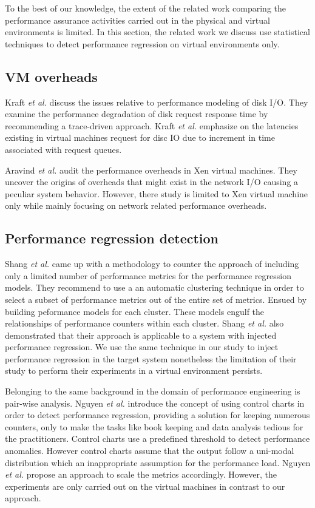 To the best of our knowledge, the extent of the related work comparing the performance assurance activities carried out in the physical and virtual environments is limited. In this section, the related work we discuss use statistical techniques to detect performance regression on virtual environments only. 

\subsection{VM overheads}

Kraft \textit{et al.} \cite{kraft2011io} discuss the issues relative to performance modeling of disk I/O. They examine the performance degradation of disk request response time by recommending a trace-driven approach. Kraft \textit{et al.} \cite{kraft2011io} emphasize on the latencies existing in virtual machines request for disc IO due to increment in time associated with request queues. 

Aravind \textit{et al.} \cite{menon2005diagnosing} audit the performance overheads in Xen virtual machines. They uncover the origins of overheads that might exist in the network I/O causing a peculiar system behavior. However, there study is limited to Xen virtual machine only while mainly focusing on network related performance overheads.

\subsection{Performance regression detection} 

Shang\textit{ et al.} \cite{Shang:2015:ADP:2668930.2688052} came up with a methodology to counter the approach of including only a limited number of performance metrics for the performance regression models. They recommend to use a an automatic clustering technique in order to select a subset of performance metrics out of the entire set of metrics. Ensued by building peformance models for each cluster. These models engulf the relationships of performance counters within each cluster. Shang\textit{ et al.} \cite{Shang:2015:ADP:2668930.2688052} also demonstrated that their approach is applicable to a system with injected performance regression. We use the same technique in our study to inject performance regression in the target system nonetheless the limitation of their study to perform their experiments in a virtual environment persists.

Belonging to the same background in the domain of performance engineering is pair-wise analysis. Nguyen \textit{et al.} \cite{Nguyen:2012:ADP:2188286.2188344} introduce the concept of using control charts in order to detect performance regression, providing a solution for keeping numerous counters, only to make the tasks like book keeping and data analysis tedious for the practitioners. Control charts use a predefined threshold to detect performance anomalies. However control charts assume that the output follow a uni-modal distribution which an inappropriate assumption for the performance load. Nguyen \textit{ et al.} propose an approach to scale the metrics accordingly. However, the experiments are only carried out on the virtual machines in contrast to our approach.

